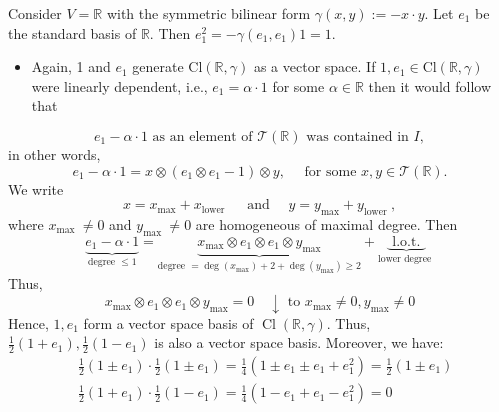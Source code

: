 \documentclass[10pt, letterpaper]{article}
\begin{document}
Consider $V=\mathbb{R}$ with the symmetric bilinear form $\gamma(x, y):=-x \cdot y$. Let $e_{1}$ be the standard basis of $\mathbb{R}$. Then $e_{1}^{2}=-\gamma\left(e_{1}, e_{1}\right) 1=1$.
\begin{itemize}
  \item Again, 1 and $e_{1}$ generate $\mathrm{Cl}(\mathbb{R}, \gamma)$ as a vector space. If $1, e_{1} \in \mathrm{Cl}(\mathbb{R}, \gamma)$ were linearly dependent, i.e., $e_{1}=\alpha \cdot 1$ for some $\alpha \in \mathbb{R}$ then it would follow that
\end{itemize}
$$
e_{1}-\alpha \cdot 1 \text { as an element of } \mathcal{T}(\mathbb{R}) \text { was contained in } I,
$$
in other words,
$$
e_{1}-\alpha \cdot 1=x \otimes\left(e_{1} \otimes e_{1}-1\right) \otimes y, \quad \text { for some } x, y \in \mathcal{T}(\mathbb{R}) .
$$
We write
$$
x=x_{\max }+x_{\text {lower }} \quad \text { and } \quad y=y_{\max }+y_{\text {lower }},
$$
where $x_{\text {max }} \neq 0$ and $y_{\text {max }} \neq 0$ are homogeneous of maximal degree. Then
$$
\underbrace{e_{1}-\alpha \cdot 1}_{\text {degree } \leq 1}=\underbrace{x_{\max } \otimes e_{1} \otimes e_{1} \otimes y_{\max }}_{\text {degree }=\operatorname{deg}\left(x_{\max }\right)+2+\operatorname{deg}\left(y_{\max }\right) \geq 2}+\underbrace{\text { l.o.t. }}_{\text {lower degree }}
$$
Thus,
$$
x_{\max } \otimes e_{1} \otimes e_{1} \otimes y_{\max }=0 \quad \downarrow \text { to } x_{\max } \neq 0, y_{\max } \neq 0
$$
Hence, $1, e_{1}$ form a vector space basis of $\operatorname{Cl}(\mathbb{R}, \gamma)$. Thus, $\frac{1}{2}\left(1+e_{1}\right), \frac{1}{2}\left(1-e_{1}\right)$ is also a vector space basis. Moreover, we have:
$$
\begin{aligned}
& \frac{1}{2}\left(1 \pm e_{1}\right) \cdot \frac{1}{2}\left(1 \pm e_{1}\right)=\frac{1}{4}\left(1 \pm e_{1} \pm e_{1}+e_{1}^{2}\right)=\frac{1}{2}\left(1 \pm e_{1}\right) \\
& \frac{1}{2}\left(1+e_{1}\right) \cdot \frac{1}{2}\left(1-e_{1}\right)=\frac{1}{4}\left(1-e_{1}+e_{1}-e_{1}^{2}\right)=0
\end{aligned}
$$
\end{document}
